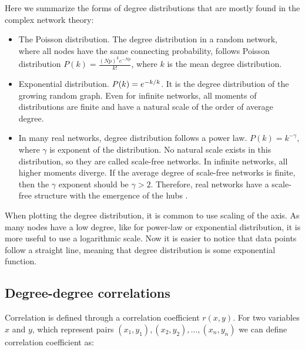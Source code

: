 Here we summarize the forms of degree distributions that are mostly found in the complex network theory:
\begin{itemize}
	\item The Poisson distribution. The degree distribution in a random network, where all nodes have the same connecting probability, follows Poisson distribution $P(k)= \frac{(Np)^ke^{-Np}}{k!}$, where $k$ is the mean degree distribution. 
	
	\item Exponential distribution. $P(k) = e^{-k/ \- k}$. It is the degree distribution of the growing random graph. Even for infinite networks, all moments of distributions are finite and have a natural scale of the order of average degree.
	
	\item In many real networks, degree distribution follows a power law. $P(k) = k ^ {-\gamma} $, where $\gamma$ is exponent of the distribution. No natural scale exists in this distribution, so they are called scale-free networks. In infinite networks, all higher moments diverge. If the average degree of scale-free networks is finite, then the $\gamma$ exponent should be $\gamma>2$. Therefore, real networks have a scale-free structure with the emergence of the hubs \cite{newman2010}. 

\end{itemize}

When plotting the degree distribution, it is common to use scaling of the axis. As many nodes have a low degree, like for power-law or exponential distribution, it is more useful to use a logarithmic scale. Now it is easier to notice that data points follow a straight line, meaning that degree distribution is some exponential function. 

\subsection{Degree-degree correlations} 

Correlation is defined through a correlation coefficient $r(x, y)$. For two variables $x$ and $y$, which represent pairs $(x_1, y_1), (x_2, y_2), ...,(x_n, y_n)$ we can define correlation coefficient \cite{van2010graph} as: 


